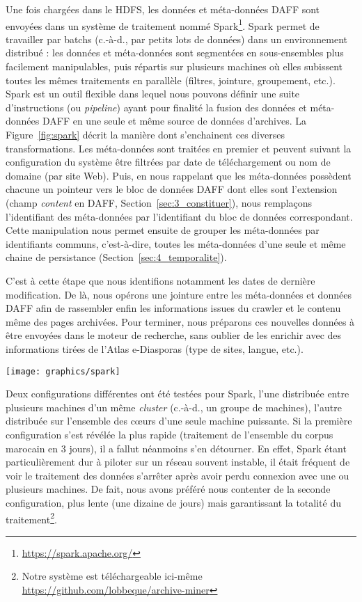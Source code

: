 \documentclass[symmetric,justified,marginals=raggedouter]{tufte-book}
\begin{document}
Une fois chargées dans le HDFS, les données et méta-données DAFF sont envoyées dans un système de traitement nommé Spark\footnote{\RaggedOuter \url{https://spark.apache.org/}}. Spark permet de travailler par batchs (c.-à-d., par petits lots de données) dans un environnement distribué : les données et méta-données sont segmentées en sous-ensembles plus facilement manipulables, puis répartis sur plusieurs machines où elles subissent toutes les mêmes traitements en parallèle (filtres, jointure, groupement, etc.). Spark est un outil flexible dans lequel nous pouvons définir une suite d'instructions (ou \textit{pipeline}) ayant pour finalité la fusion des données et méta-données DAFF en une seule et même source de données d'archives. La Figure~\ref{fig:spark} décrit la manière dont s'enchainent ces diverses transformations. Les méta-données sont traitées en premier et peuvent suivant la configuration du système être filtrées par date de téléchargement ou nom de domaine (par site Web). Puis, en nous rappelant que les méta-données possèdent chacune un pointeur vers le bloc de données DAFF dont elles sont l'extension (champ \textit{content} en DAFF, Section~\ref{sec:3_constituer}), nous remplaçons l'identifiant des méta-données par l'identifiant du bloc de données correspondant. Cette manipulation nous permet ensuite de grouper les méta-données par identifiants communs, c'est-à-dire, toutes les méta-données d'une seule et même chaine de persistance (Section~\ref{sec:4_temporalite}). 

C'est à cette étape que nous identifions notamment les dates de dernière modification. De là, nous opérons une jointure entre les méta-données et données DAFF afin de rassembler enfin les informations issues du crawler et le contenu même des pages archivées. Pour terminer, nous préparons ces nouvelles données à être envoyées dans le moteur de recherche, sans oublier de les enrichir avec des informations tirées de l'Atlas e-Diasporas (type de sites, langue, etc.).  

\begin{figure*}%
  \texttt{[image: graphics/spark]}
  \caption{Pipeline de transformation des données et méta-données DAFF}
  \label{fig:spark}
\end{figure*}

\noindent Deux configurations différentes ont été testées pour Spark, l'une distribuée entre plusieurs machines d'un même \textit{cluster} (c.-à-d., un groupe de machines), l'autre distribuée sur l'ensemble des cœurs d'une seule machine puissante. Si la première configuration s'est révélée la plus rapide (traitement de l'ensemble du corpus marocain en 3 jours), il a fallut néanmoins s'en détourner. En effet, Spark étant particulièrement dur à piloter sur un réseau souvent instable, il était fréquent de voir le traitement des données s'arrêter après avoir perdu connexion avec une ou plusieurs machines. De fait, nous avons préféré nous contenter de la seconde configuration, plus lente (une dizaine de jours) mais garantissant la totalité du traitement\footnote{\RaggedOuter Notre système est téléchargeable ici-même \url{https://github.com/lobbeque/archive-miner}}. 
\end{document}
